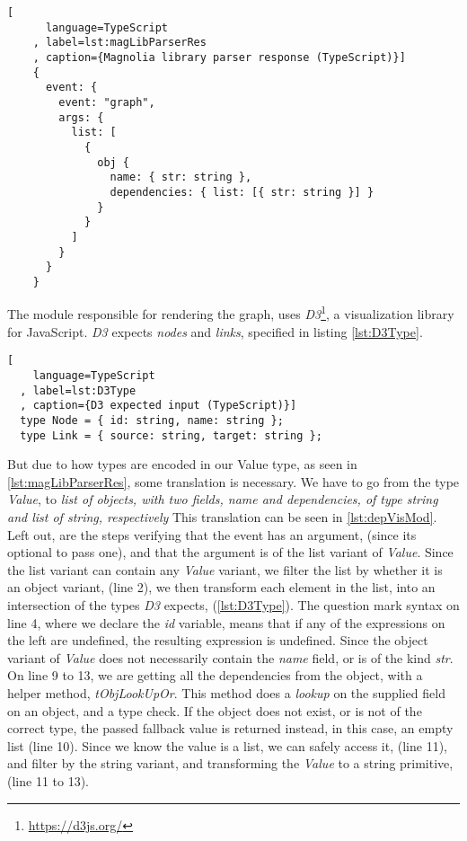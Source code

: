 \begin{code}[H]
  \begin{lstlisting}[
      language=TypeScript
    , label=lst:magLibParserRes
    , caption={Magnolia library parser response (TypeScript)}]
    {
      event: {
        event: "graph",
        args: {
          list: [
            {
              obj {
                name: { str: string },
                dependencies: { list: [{ str: string }] }
              }
            }
          ]
        }
      }
    }
  \end{lstlisting}
\end{code}

The module responsible for rendering the graph, uses
\textit{D3}\footnote{\url{https://d3js.org/}}, a visualization library for
JavaScript. \textit{D3} expects \textit{nodes} and \textit{links}, specified in
listing \ref{lst:D3Type}.

\begin{lstlisting}[
    language=TypeScript
  , label=lst:D3Type
  , caption={D3 expected input (TypeScript)}]
  type Node = { id: string, name: string };
  type Link = { source: string, target: string };
\end{lstlisting}

But due to how types are encoded in our Value type, as seen in
\ref{lst:magLibParserRes}, some translation is necessary. We have to go from the
type \textit{Value}, to
\textit{
  list of objects, with two fields, name and dependencies, of type string and
  list of string, respectively}
This translation can be seen in \ref{lst:depVisMod}. Left out, are the steps
verifying that the event has an argument, (since its optional to pass one), and
that the argument is of the list variant of \textit{Value}. Since the list
variant can contain any \textit{Value} variant, we filter the list by whether it
is an object variant, (line 2), we then transform each element in the list, into
an intersection of the types \textit{D3} expects, (\ref{lst:D3Type}). The
question mark syntax on line 4, where we declare the \textit{id} variable, means
that if any of the expressions on the left are undefined, the resulting
expression is undefined. Since the object variant of \textit{Value} does not
necessarily contain the \textit{name} field, or is of the kind \textit{str}. On
line 9 to 13, we are getting all the dependencies from the object, with a helper
method, \textit{tObjLookUpOr}. This method does a \textit{lookup} on the
supplied field on an object, and a type check. If the object does not exist, or
is not of the correct type, the passed fallback value is returned instead, in
this case, an empty list (line 10). Since we know the value is a list, we can
safely access it, (line 11), and filter by the string variant, and transforming
the \textit{Value} to a string primitive, (line 11 to 13).


